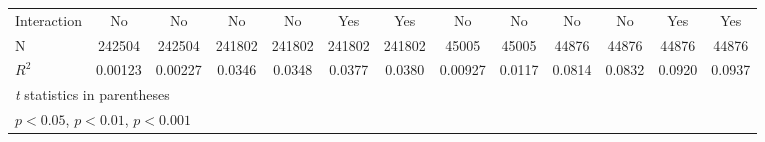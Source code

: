{\begin{tabular}{l*{12}{c}}
Interaction         &          No         &          No         &          No         &          No         &         Yes         &         Yes         &          No         &          No         &          No         &          No         &         Yes         &         Yes         \\
N                   &      242504         &      242504         &      241802         &      241802         &      241802         &      241802         &       45005         &       45005         &       44876         &       44876         &       44876         &       44876         \\
$ R^2 $                  &     0.00123         &     0.00227         &      0.0346         &      0.0348         &      0.0377         &      0.0380         &     0.00927         &      0.0117         &      0.0814         &      0.0832         &      0.0920         &      0.0937         \\
\hline\hline
\multicolumn{13}{l}{\footnotesize \textit{t} statistics in parentheses}\\
\multicolumn{13}{l}{\footnotesize \sym{*} \(p<0.05\), \sym{**} \(p<0.01\), \sym{***} \(p<0.001\)}\\
\end{tabular}
}
